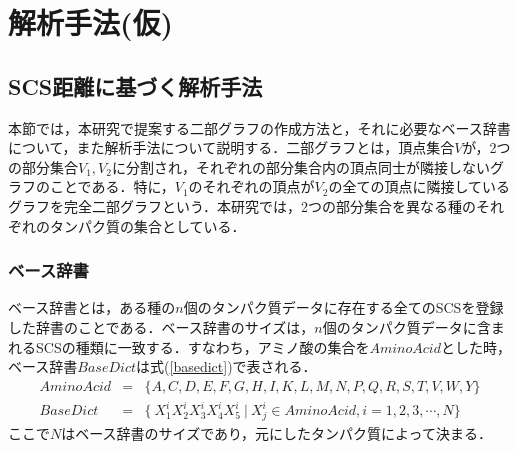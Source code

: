 \chapter{解析手法(仮)}

\section{SCS距離に基づく解析手法}
本節では，本研究で提案する二部グラフの作成方法と，それに必要なベース辞書について，また解析手法について説明する．二部グラフとは，頂点集合$V$が，2つの部分集合$V_1, V_2$に分割され，それぞれの部分集合内の頂点同士が隣接しないグラフのことである．特に，$V_1$のそれぞれの頂点が$V_2$の全ての頂点に隣接しているグラフを完全二部グラフという．本研究では，2つの部分集合を異なる種のそれぞれのタンパク質の集合としている．

\subsection{ベース辞書}
ベース辞書とは，ある種の$n$個のタンパク質データに存在する全てのSCSを登録した辞書のことである．ベース辞書のサイズは，$n$個のタンパク質データに含まれるSCSの種類に一致する．すなわち，アミノ酸の集合を$\mathit{AminoAcid}$とした時，ベース辞書$\mathit{BaseDict}$は式(\ref{basedict})で表される．
\begin{align}
\mathit{AminoAcid} &=& \{\mathit{A, C, D, E, F, G, H, I, K, L, M, N, P, Q, R, S, T, V, W, Y}\}\\
\label{basedict}
\mathit{BaseDict} &=& \{\ X_1^i X_2^iX_3^iX_4^iX_5^i\ |\ X_j^i \in \mathit{AminoAcid}, i = 1, 2, 3, \cdots , N \}
\end{align}
ここで$N$はベース辞書のサイズであり，元にしたタンパク質によって決まる．
